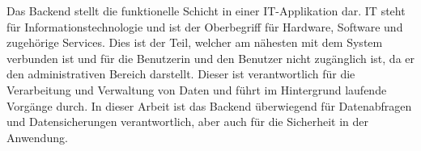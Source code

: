 Das Backend stellt die funktionelle Schicht in einer IT-Applikation dar. IT steht für Informationstechnologie und ist der Oberbegriff für Hardware, Software und zugehörige Services. Dies ist der Teil, welcher am nähesten mit dem System verbunden ist und für die Benutzerin und den Benutzer nicht zugänglich ist, da er den administrativen Bereich darstellt. Dieser ist verantwortlich für die Verarbeitung und Verwaltung von Daten und führt im Hintergrund laufende Vorgänge durch. In dieser Arbeit ist das Backend überwiegend für Datenabfragen und Datensicherungen verantwortlich, aber auch für die Sicherheit in der Anwendung.
\cite{Backend_Basics}